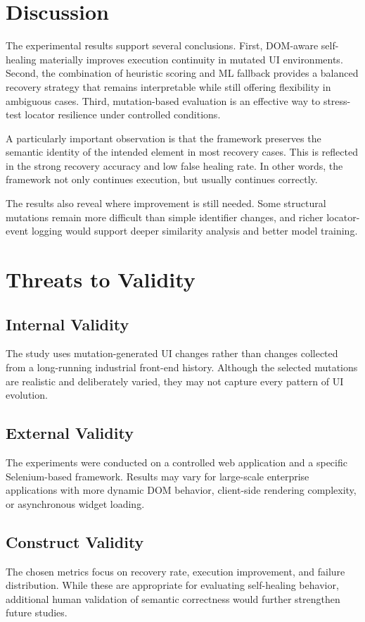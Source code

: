 \documentclass[conference]{IEEEtran}
\begin{document}
\section{Discussion}
The experimental results support several conclusions. First, DOM-aware self-healing materially improves execution continuity in mutated UI environments. Second, the combination of heuristic scoring and ML fallback provides a balanced recovery strategy that remains interpretable while still offering flexibility in ambiguous cases. Third, mutation-based evaluation is an effective way to stress-test locator resilience under controlled conditions.

A particularly important observation is that the framework preserves the semantic identity of the intended element in most recovery cases. This is reflected in the strong recovery accuracy and low false healing rate. In other words, the framework not only continues execution, but usually continues correctly.

The results also reveal where improvement is still needed. Some structural mutations remain more difficult than simple identifier changes, and richer locator-event logging would support deeper similarity analysis and better model training.

\section{Threats to Validity}
\subsection{Internal Validity}
The study uses mutation-generated UI changes rather than changes collected from a long-running industrial front-end history. Although the selected mutations are realistic and deliberately varied, they may not capture every pattern of UI evolution.

\subsection{External Validity}
The experiments were conducted on a controlled web application and a specific Selenium-based framework. Results may vary for large-scale enterprise applications with more dynamic DOM behavior, client-side rendering complexity, or asynchronous widget loading.

\subsection{Construct Validity}
The chosen metrics focus on recovery rate, execution improvement, and failure distribution. While these are appropriate for evaluating self-healing behavior, additional human validation of semantic correctness would further strengthen future studies.
\end{document}
